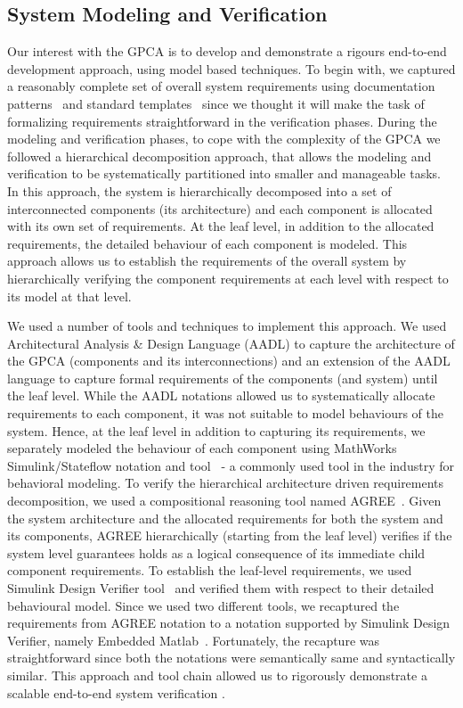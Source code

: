 \subsection {System Modeling and Verification}
\vspace{-0.07in}
Our interest with the GPCA is to develop and demonstrate a rigours end-to-end development approach, using model based techniques. To begin with, we captured a reasonably complete set of overall system requirements using documentation patterns~\cite{mavin2009easy} and standard templates~\cite{IEEEFormats} since we thought it will make the task of formalizing requirements straightforward in the verification phases. During the modeling and verification phases, to cope with the complexity of the GPCA we followed a hierarchical decomposition approach, that allows the modeling and verification to be systematically partitioned into smaller and manageable tasks. In this approach, the system is hierarchically decomposed into a set of interconnected components (its architecture) and each component is allocated with its own set of requirements. At the leaf level, in addition to the allocated requirements, the detailed behaviour of each component is modeled. This approach allows us to establish the requirements of the overall system by hierarchically verifying the component requirements at each level with respect to its model at that level.

We used a number of tools and techniques to implement this approach. We used Architectural Analysis \& Design Language (AADL) to capture the architecture of the GPCA (components and its interconnections) and an extension of the AADL language to capture formal requirements of the components (and system) until the leaf level. While the AADL notations allowed us to systematically allocate requirements to each component, it was not suitable to model behaviours of the system. Hence, at the leaf level in addition to capturing its requirements, we separately modeled the behaviour of each component using MathWorks Simulink/Stateflow notation and tool~\cite{Simulink} - a commonly used tool in the industry for behavioral modeling. To verify the hierarchical architecture driven requirements decomposition, we used a compositional reasoning tool named AGREE~\cite{NFM2012:CoGaMiWhLaLu}. Given the system architecture and the allocated requirements for both the system and its components, AGREE hierarchically (starting from the leaf level) verifies if the system level guarantees holds as a logical consequence of its immediate child component requirements. To establish the leaf-level requirements, we used Simulink Design Verifier tool~\cite{SimulinkDesignVerifier} and verified them with respect to their detailed behavioural model. Since we used two different tools, we recaptured the requirements from AGREE notation to a notation supported by Simulink Design Verifier, namely Embedded Matlab~\cite{EmbeddedMatlab:Website}. Fortunately, the recapture was straightforward since both the notations were semantically same and syntactically similar. This approach and tool chain allowed us to rigorously demonstrate a scalable end-to-end system verification   .


